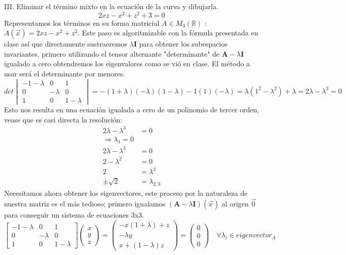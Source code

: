 \documentclass{article}
\begin{document}
\newpage
\noindent III. Eliminar el término mixto en la ecuación de la curva y dibujarla.
\begin{equation}
    2xz - x^2 + z^2 + 3 = 0
\end{equation}
Representamos los términos en su forma matricial $A \in M_3(\mathbb{R})$ : $A(\Vec{x}) = 2xz - x^2 + z^2$. Este paso es algoritmizable con la fórmula presentada en clase así que directamente sustraeremos $\lambda \textbf{I}$ para obtener los subespacios invariantes, primero utilizando el tensor alternante "determinante" de $\textbf{A} - \lambda \textbf{I}$ igualado a cero obtendremos los eigenvalores como se vió en clase. El método a usar será el determinante por menores.
\begin{equation*}
    det\begin{vmatrix}
        -1-\lambda & 0 & 1 \\
        0 & -\lambda & 0 \\
        1 & 0 & 1-\lambda
    \end{vmatrix} = -(1+\lambda)(-\lambda)(1-\lambda)-1(1)(-\lambda) = \lambda(1^2-\lambda^2)+\lambda = 2\lambda - \lambda^3 = 0
\end{equation*}
Esto nos resulta en una ecuación igualada a cero de un polinomio de tercer orden, vease que es casi directa la resolución:
\begin{align*}
    2\lambda - \lambda^3 &= 0 \\
    \Rightarrow \lambda_1 = 0 \\
    2\lambda - \lambda^3 &= 0 \\
    2 - \lambda^2 &= 0 \\
    2 &= \lambda^2 \\
    \pm \sqrt{2} &= \lambda_{2,3}
\end{align*}
Necesitamos ahora obtener los eigenvectores, este proceso por la naturaleza de nuestra matriz es el más tedioso; primero igualamos $(\textbf{A} - \lambda \textbf{I})(\Vec{x})$ al origen $\Vec{0}$ para conseguir un sistema de ecuaciones 3x3.
\begin{equation}
    \begin{bmatrix}
        -1-\lambda & 0 & 1 \\
        0 & -\lambda & 0 \\
        1 & 0 & 1-\lambda
    \end{bmatrix}
    \begin{pmatrix}
        x \\ y \\ z
    \end{pmatrix} = 
    \begin{pmatrix}
        -x(1+\lambda)+z \\
        -\lambda y \\
        x + (1-\lambda)z
    \end{pmatrix} =
    \begin{pmatrix}
        0 \\ 0 \\ 0
    \end{pmatrix} \quad \forall \lambda_i \in eigenvector_A
\end{equation}
\end{document}
